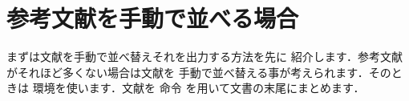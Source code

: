 \section{参考文献を手動で並べる場合}
%

\oldBibItem%

まずは文献を手動で並べ替えそれを出力する方法を先に
紹介します．参考文献がそれほど多くない場合は文献を
手動で並べ替える事が考えられます．そのときは
環境を使います．文献を 命令
を用いて文書の末尾にまとめます．
%

